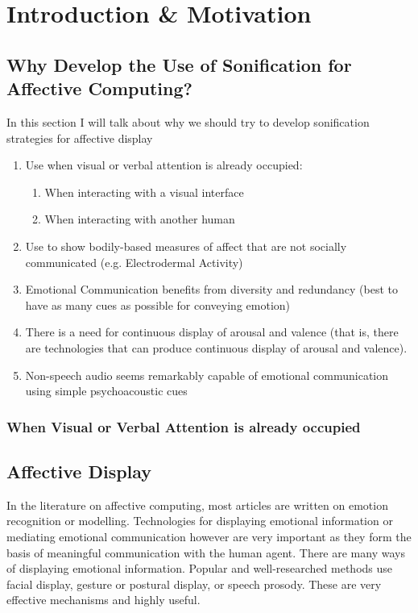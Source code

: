 \chapter{Introduction \& Motivation}

\section{Why Develop the Use of Sonification for Affective Computing?}
In this section I will talk about why we should try to develop sonification strategies for affective display

\begin{enumerate}
\item Use when visual or verbal attention is already occupied:
	\begin{enumerate}
	\item When interacting with a visual interface
	\item When interacting with another human
	\end{enumerate}
\item Use to show bodily-based measures of affect that are not socially communicated (e.g. Electrodermal Activity)
\item Emotional Communication benefits from diversity and redundancy (best to have as many cues as possible for conveying emotion)
\item There is a need for continuous display of arousal and valence (that is, there are technologies that can produce continuous display of arousal and valence).
\item Non-speech audio seems remarkably capable of emotional communication using simple psychoacoustic cues
\end{enumerate}

\subsection{When Visual or Verbal Attention is already occupied}
\section{Affective Display}

In the literature on affective computing, most articles are written on emotion recognition or modelling.  Technologies for displaying emotional information or mediating emotional communication however are very important as they form the basis of meaningful communication with the human agent.  There are many ways of displaying emotional information.  Popular and well-researched methods use facial display, gesture or postural display, or speech prosody.  These are very effective mechanisms and highly useful.  

